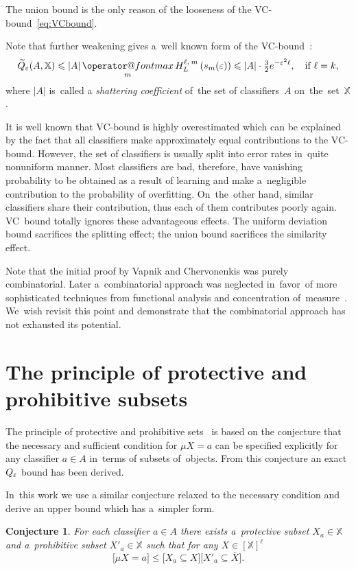 \documentclass{article}
\makeatletter
\let\cite\citep
\def\XX{\mathbb{X}}
\newcommand{\XXell}{[\XX]^\ell}
\newcommand{\X}{\bar X}
\renewcommand{\leq}{\leqslant}
\renewcommand{\max}{\mathop{\operator@font max}\limits}
\newcommand{\wtil}{\widetilde}
\newcommand{\hypergeom}[5]{{#1}_{#2}^{#4,\:#3}\left(#5\right)}
\newcommand{\Hyper}[4]{\hypergeom{H}{#1}{#2}{#3}{#4}}
\renewcommand{\emph}[1]{\textit{#1}}
\newtheorem{conjecture}[theorem]{Conjecture}
\makeatother
\begin{document}
The union bound is the only reason of the looseness of the VC-bound~\eqref{eq:VCbound}.

Note that further weakening gives a~well known form of the VC-bound~\cite{vapnik98stat}:
\[
    \wtil Q_\eps(A, \XX)
    \leq
    |A| \max_m \Hyper{L}{m}{\ell}{s_m(\eps)}
    \leq
    |A| \cdot \tfrac32 e^{-\eps^2\ell},
    \quad
    \text{if } \ell=k,
\]
where $|A|$ is~called a \emph{shattering coefficient} of~the set of classifiers~$A$ on~the~set~$\XX$.

\medskip
It is well known that VC-bound is highly overestimated which can be explained by the fact that
all classifiers make approximately equal contributions to the VC-bound.
However, the set of classifiers is usually split into error rates in~quite nonuniform manner.
Most classifiers are bad, therefore,
have vanishing probability to be obtained as a result of learning
and make a~negligible contribution to the probability of overfitting.
On~the~other hand, similar classifiers share their contribution,
thus each of them contributes poorly again.
VC~bound totally ignores these advantageous effects.
The uniform deviation bound sacrifices the splitting effect;
the union bound sacrifices the similarity effect.

\medskip
Note that the initial proof by Vapnik and Chervonenkis was purely combinatorial.
Later %
a~combinatorial approach was neglected in~favor~of more sophisticated techniques from
functional analysis and concentration of~measure~\cite{lugosi98concentrationmeasure,boucheron00sharp}.
We~wish revisit this point and demonstrate that the combinatorial approach
has not exhausted its potential.

\section{The principle of protective and prohibitive subsets}
\label{sec:ProtProh}

The principle of protective and prohibitive sets~\cite{voron10pria-eng}
is based on the conjecture that
the necessary and sufficient condition for $\mu X=a$ can be specified explicitly
for any classifier $a\in A$
in~terms of subsets of~objects.
From this conjecture an exact $Q_\varepsilon$ bound has been derived.

In~this work we use a similar conjecture relaxed to the necessary condition
and derive an upper bound which has a~simpler form.

\begin{conjecture}
\label{hyp:1}
    For each classifier $a\in A$  there exists
    a~\emph{protective subset} $X_a\in \XX$ and
    a~\emph{prohibitive subset} $X'_a\in \XX$ such that
    for any $X\in\XXell$
    \begin{equation}
    \label{eq:hyp1}
    	\bigl[ \mu X \!=\! a \bigr] \leq
        \bigl[X_a \!\subseteq\! X \bigr]
        \bigl[X'_a \!\subseteq\! \X \bigr].
    \end{equation}
\end{conjecture}
\end{document}
